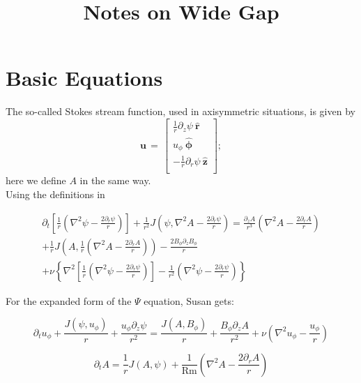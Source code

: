 \documentclass{paper}
\newcommand{\beq}{\begin{equation}}
\newcommand{\eeq}{\end{equation}}
\newcommand{\uphi}{\ensuremath{u_\phi}}
\newcommand{\rhat}{\ensuremath{\mathbf{\hat{r}}}}
\newcommand{\phihat}{\ensuremath{\mathbf{\hat{\phi}}}}
\newcommand{\zhat}{\ensuremath{\mathbf{\hat{z}}}}
\newcommand\reym{\mathrm{Rm}}
\begin{document}
\title{Notes on Wide Gap}

\section{Basic Equations}
\label{sec:equations}
The so-called Stokes stream function, used in axisymmetric situations, is given by 
\begin{equation}
  \label{eq:stokes}
  \mathbf{u} \, = \, \left[\begin{matrix}
\frac{1}{r} \partial_z \psi\ \rhat\\
\uphi \ \phihat\\
-\frac{1}{r} \partial_r \psi\ \zhat\\
\end{matrix}\right];
\end{equation}
here we define $A$ in the same way. \\

Using the definitions in 

\begin{multline}
  \label{eq:psi}
\partial_t \left[ \frac{1}{r} \left(\nabla^2 \psi - \frac{2 \partial_r \psi}{r} \right) \right] + \frac{1}{r^2} J(\psi, \nabla^2 A - \frac{2 \partial_r \psi}{r}) = \frac{\partial_z A}{r^3} \left( \nabla^2 A - \frac{2 \partial_r A}{r}\right) \\
+ \frac{1}{r} J\left(A,\frac{1}{r}\left( \nabla^2 A - \frac{2 \partial_r A}{r}\right)\right) - \frac{2 B_\phi \partial_z B_\phi}{r}\\
+ \nu \left\{ \nabla^2 \left[ \frac{1}{r} \left(\nabla^2 \psi - \frac{2 \partial_r \psi}{r}\right) \right]  -\frac{1}{r^2} \left(\nabla^2 \psi - \frac{2 \partial_r \psi}{r}\right) \right\}
\end{multline}

For the expanded form of the $\Psi$ equation, Susan gets:


\begin{equation}
  \label{eq:uy}
\partial_t \uphi + \frac{J(\psi, \uphi)}{r} + \frac{\uphi \partial_z \psi}{r^2} = \frac{J(A, B_\phi)}{r} + \frac{B_\phi \partial_z A}{r^2} + \nu \left( \nabla^2 \uphi - \frac{\uphi}{r}\right)
\end{equation}


\beq
\partial_t A = \frac{1}{r} J(A, \psi) + \frac{1}{\reym} \left( \nabla^2 A - \frac{2 \partial_r A}{r} \right)
\eeq
\end{document}

